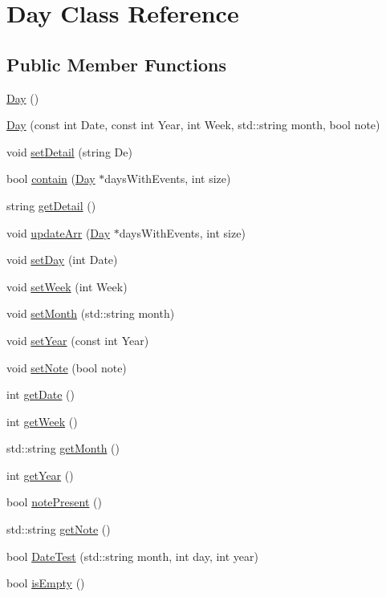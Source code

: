 \hypertarget{class_day}{}\section{Day Class Reference}
\label{class_day}
\subsection*{Public Member Functions}
\begin{DoxyCompactItemize}
\item 
\hyperlink{class_day_a0d38b5839dd80b179cb8f0669283b3aa}{Day} ()
\item 
\hyperlink{class_day_a1f2f885b1328511d8b96b050673ba35d}{Day} (const int Date, const int Year, int Week, std\+::string month, bool note)
\item 
void \hyperlink{class_day_acb0181b89543f4a0e71f85d5ddb78651}{set\+Detail} (string De)
\item 
bool \hyperlink{class_day_a84a4efadd13d49d372d47ad609c5f598}{contain} (\hyperlink{class_day}{Day} $\ast$days\+With\+Events, int size)
\item 
string \hyperlink{class_day_adf187d211b1ea4561832486f7094b18b}{get\+Detail} ()
\item 
void \hyperlink{class_day_afb73606e2cd648edcc8256a8d76a3dbb}{update\+Arr} (\hyperlink{class_day}{Day} $\ast$days\+With\+Events, int size)
\item 
void \hyperlink{class_day_a0dcbab77f0504f01fdd9a8584b590121}{set\+Day} (int Date)
\item 
void \hyperlink{class_day_abd9ffcfab90af3e2defaa2491a3761bb}{set\+Week} (int Week)
\item 
void \hyperlink{class_day_aa6fc8b1b08074305e6b0dd3f4bc21151}{set\+Month} (std\+::string month)
\item 
void \hyperlink{class_day_a9fc013d905327fd70003970125247d91}{set\+Year} (const int Year)
\item 
void \hyperlink{class_day_a40f873f51621bdb3cf657e127d43cdaf}{set\+Note} (bool note)
\item 
int \hyperlink{class_day_a6161ef9f7717d596af00031cc362fa04}{get\+Date} ()
\item 
int \hyperlink{class_day_a43799b84e1a16df9bf16b3de69605b9a}{get\+Week} ()
\item 
std\+::string \hyperlink{class_day_ae10fc576ccdf6d58ef42c8cd1b371401}{get\+Month} ()
\item 
int \hyperlink{class_day_acec9a2c25c4e19fa6f46cd2671dfa51d}{get\+Year} ()
\item 
bool \hyperlink{class_day_a097b2409c34e772e1b133c2c344ab2bf}{note\+Present} ()
\item 
std\+::string \hyperlink{class_day_ac0d1e5a970de4e30bc563c33cf69cbc3}{get\+Note} ()
\item 
bool \hyperlink{class_day_afb77f4b9df921cfb4176ba6ef309b9b8}{Date\+Test} (std\+::string month, int day, int year)
\item 
bool \hyperlink{class_day_aa4dd0d85c6fa11300b10c2a40c530c4f}{is\+Empty} ()
\end{DoxyCompactItemize}


